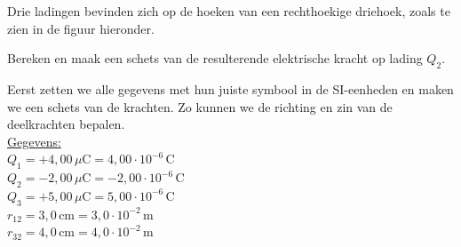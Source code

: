 \documentclass{ximera}
\begin{document}
\begin{example}[foldable=true,title={Voorbeeld: loodrechte krachten in een driehoek}]\label{vb:driehoek}\nl
    Drie ladingen bevinden zich op de hoeken van een rechthoekige driehoek, zoals te zien in de figuur hieronder.            
    
    \begin{center}
    \end{center}
    
    Bereken en maak een schets van de resulterende elektrische kracht op lading $Q_{2}$. 

    \begin{solution}\nl
        Eerst zetten we alle gegevens met hun juiste symbool in de SI-eenheden en maken we een schets van de krachten. Zo kunnen we de richting en zin van de deelkrachten bepalen.\\[1ex]
        
        \underline{Gegevens:}\\
        $Q_{1} = +4{,}00 \, \mu\mathrm{C} = 4{,}00 \cdot 10^{-6} \, \mathrm{C}$\\
        $Q_{2} = -2{,}00 \, \mu\mathrm{C} = -2{,}00 \cdot 10^{-6} \, \mathrm{C}$\\
        $Q_{3} = +5{,}00 \, \mu\mathrm{C} = 5{,}00 \cdot 10^{-6} \, \mathrm{C}$\\
        $r_{12} = 3{,}0 \, \mathrm{cm} = 3{,}0 \cdot 10^{-2} \, \mathrm{m}$\\
        $r_{32} = 4{,}0 \, \mathrm{cm} = 4{,}0 \cdot 10^{-2} \, \mathrm{m}$
        

\end{solution}
\end{example}
\end{document}
